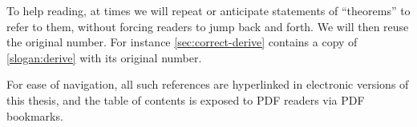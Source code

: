 To help reading, at times we will repeat or anticipate statements of
``theorems'' to refer to them, without forcing readers to jump back and forth.
We will then reuse the original number.
For instance \cref{sec:correct-derive} contains a copy of \cref{slogan:derive}
with its original number.

For ease of navigation, all such references are hyperlinked in electronic
versions of this thesis, and the table of contents is exposed to PDF readers via
PDF bookmarks.









